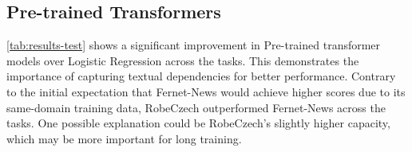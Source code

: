 \subsection{Pre-trained Transformers}
\autoref{tab:results-test} shows a significant improvement in Pre-trained transformer models over
Logistic Regression across the tasks. This demonstrates the importance of capturing textual dependencies for better performance.
Contrary to the initial expectation that Fernet-News would achieve higher
scores due to its same-domain training data, RobeCzech outperformed Fernet-News across the tasks.
One possible explanation could be RobeCzech's slightly
higher capacity, which may be more important for long training.
\begin{table}[h]
\end{table}

